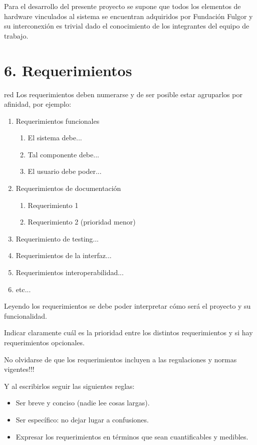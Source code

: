 \documentclass[
11pt, %
codirector, %
]{charter}
\begin{document}

Para el desarrollo del presente proyecto se supone que todos los elementos de hardware vinculados al sistema se encuentran adquiridos por Fundación Fulgor y su interconexión es trivial dado el conocimiento de los integrantes del equipo de trabajo.

\section{6. Requerimientos}
\label{sec:requerimientos}

\begin{consigna}{red}
Los requerimientos deben numerarse y de ser posible estar agruparlos por afinidad, por ejemplo:

\begin{enumerate}
	\item Requerimientos funcionales
		\begin{enumerate}
			\item El sistema debe...
			\item Tal componente debe...
			\item El usuario debe poder...
		\end{enumerate}
	\item Requerimientos de documentación
		\begin{enumerate}
			\item Requerimiento 1
			\item Requerimiento 2 (prioridad menor)
		\end{enumerate}
	\item Requerimiento de testing...
	\item Requerimientos de la interfaz...
	\item Requerimientos interoperabilidad...
	\item etc...
\end{enumerate}

Leyendo los requerimientos se debe poder interpretar cómo será el proyecto y su funcionalidad.

Indicar claramente cuál es la prioridad entre los distintos requerimientos y si hay requerimientos opcionales. 

No olvidarse de que los requerimientos incluyen a las regulaciones y normas vigentes!!!

Y al escribirlos seguir las siguientes reglas:
\begin{itemize}
	\item Ser breve y conciso (nadie lee cosas largas). 
	\item Ser específico: no dejar lugar a confusiones.
	\item Expresar los requerimientos en términos que sean cuantificables y medibles.
\end{itemize}

\end{consigna}
\end{document}
